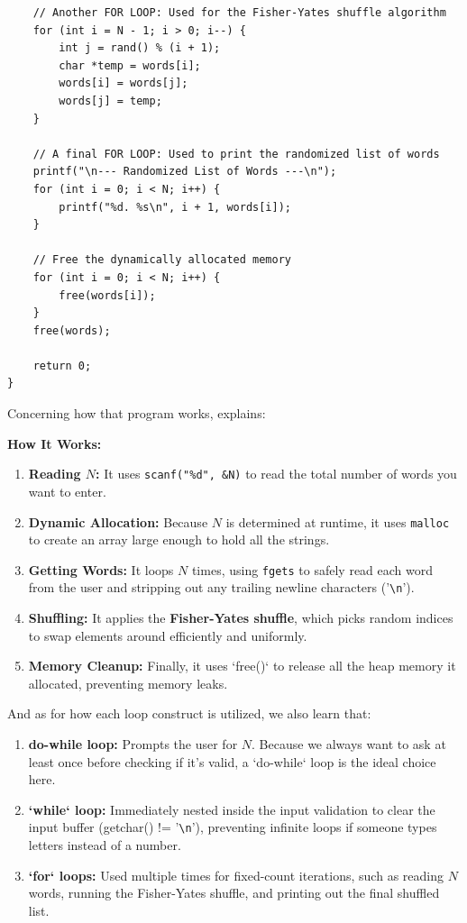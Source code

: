 \documentclass[a4paper, 18pt]{book} %
\begin{document}
{{{\begin{appendices}
\begin{tcolorbox}[myterminalstyle, title=C: Conditional Looping in C: Random Word List Presenter, breakable]
\begin{lstlisting}
    // Another FOR LOOP: Used for the Fisher-Yates shuffle algorithm
    for (int i = N - 1; i > 0; i--) {
        int j = rand() % (i + 1);
        char *temp = words[i];
        words[i] = words[j];
        words[j] = temp;
    }

    // A final FOR LOOP: Used to print the randomized list of words
    printf("\n--- Randomized List of Words ---\n");
    for (int i = 0; i < N; i++) {
        printf("%d. %s\n", i + 1, words[i]);
    }

    // Free the dynamically allocated memory
    for (int i = 0; i < N; i++) {
        free(words[i]);
    }
    free(words);

    return 0;
}
\end{lstlisting}
  \end{tcolorbox}


Concerning how that program works, \cite{google_ai_assistant_gemini} explains:

\textbf{How It Works:}

\begin{enumerate}
\item \textbf{Reading $N$:} It uses \texttt{scanf("\%d", \&N)} to read the total number of words you want to enter.
\item \textbf{Dynamic Allocation:} Because $N$ is determined at runtime, it uses \texttt{malloc} to create an array large enough to hold all the strings.
\item  \textbf{Getting Words:} It loops $N$ times, using \texttt{fgets} to safely read each word from the user and stripping out any trailing newline characters ('\verb!\n!').
\item \textbf{Shuffling:} It applies the \textbf{Fisher-Yates shuffle}, which picks random indices to swap elements around efficiently and uniformly.
\item \textbf{Memory Cleanup:} Finally, it uses `free()` to release all the heap memory it allocated, preventing memory leaks.
\end{enumerate}


And as for how each loop construct is utilized, we also learn that:

\begin{enumerate}
\item  \textbf{do-while loop:} Prompts the user for $N$. Because we always want to ask at least once before checking if it's valid, a `do-while` loop is the ideal choice here.
\item \textbf{`while` loop:} Immediately nested inside the input validation to clear the input buffer (getchar() != '\verb!\n!'), preventing infinite loops if someone types letters instead of a number.
\item \textbf{`for` loops:} Used multiple times for fixed-count iterations, such as reading $N$ words, running the Fisher-Yates shuffle, and printing out the final shuffled list.
\end{enumerate}



\end{appendices}}}}
\end{document}

